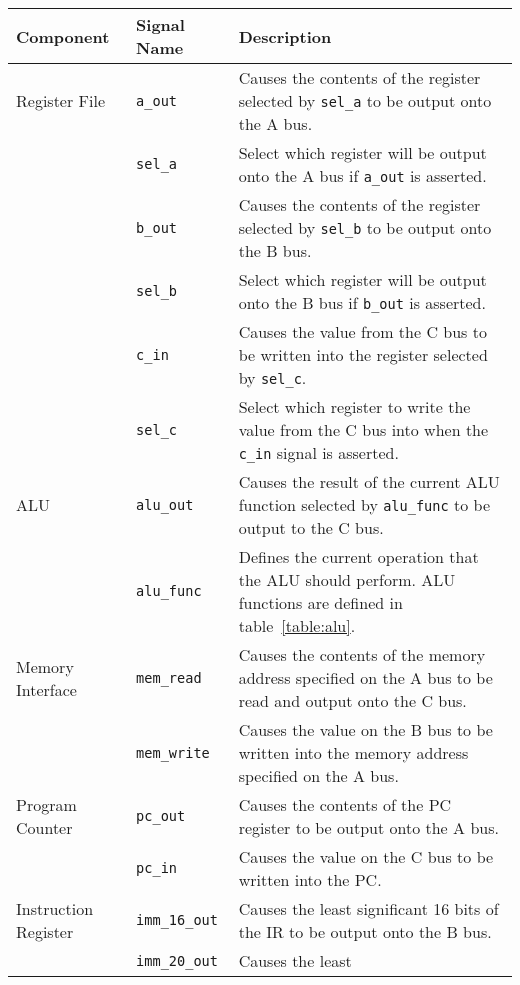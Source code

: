 \documentclass[a4paper,10pt]{article}
\begin{document}
\newpage

\begin{table}[h]
\begin{center}
\begin{tabular}{|l|l|p{8cm}|}
\hline
\textbf{Component} & \textbf{Signal Name} & \textbf{Description} \\
\hline
Register File & \texttt{a\_out} & Causes the contents of the
register selected by \texttt{sel\_a} to be output onto the A bus. \\
\cline{2-3}
& \texttt{sel\_a} & Select which register will be output onto the A bus
if \texttt{a\_out} is asserted. \\
\cline{2-3}
& \texttt{b\_out} & Causes the contents of the
register selected by \texttt{sel\_b} to be output onto the B bus. \\
\cline{2-3}
& \texttt{sel\_b} & Select which register will be output onto the B bus
if \texttt{b\_out} is asserted. \\
\cline{2-3}
& \texttt{c\_in} & Causes the value from the C bus to be written
into the register selected by \texttt{sel\_c}.\\
\cline{2-3}
& \texttt{sel\_c} & Select which register to write the value from the C
bus into when the \texttt{c\_in} signal is asserted. \\
\hline
ALU & \texttt{alu\_out} & Causes the result of the current ALU function 
selected by \texttt{alu\_func} to be output to the C bus. \\
\cline{2-3}
& \texttt{alu\_func} & Defines the current operation that the ALU
should perform. ALU functions are defined in table~\ref{table:alu}. \\
\hline
Memory Interface & \texttt{mem\_read} & Causes the contents of the
memory address specified on the A bus to be read and output onto the C
bus. \\
\cline{2-3}
& \texttt{mem\_write} & Causes the value on the B bus to be written
into the memory address specified on the A bus. \\
\hline
Program Counter & \texttt{pc\_out} & Causes the contents of the PC
register to be output onto the A bus. \\
\cline{2-3}
& \texttt{pc\_in} & Causes the value on the C bus to be written into
the PC. \\
\hline
Instruction Register & \texttt{imm\_16\_out} & Causes the least
significant 16 bits of the IR to be output onto the B bus. \\
\cline{2-3}
& \texttt{imm\_20\_out} & Causes the least

\end{tabular}
\end{center}
\end{table}
\end{document}
